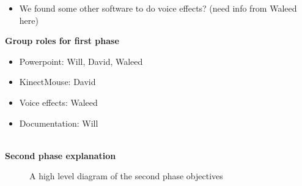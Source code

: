 \documentclass[12pt]{article}
\begin{document}
\begin{description}
\begin{itemize}
\begin{itemize}
				\end{itemize}
			\item We found some other software to do voice effects? (need info from Waleed here)
		\end{itemize}
		\textbf{Group roles for first phase}
		\begin{itemize}
			\item Powerpoint: Will, David, Waleed
			\item KinectMouse: David
			\item Voice effects: Waleed
			\item Documentation: Will
		\end{itemize} \hfill \\
		\textbf{Second phase explanation}
		\begin{figure}[H]
			\caption{A high level diagram of the second phase objectives}
		\end{figure}
\end{description}
\end{document}

